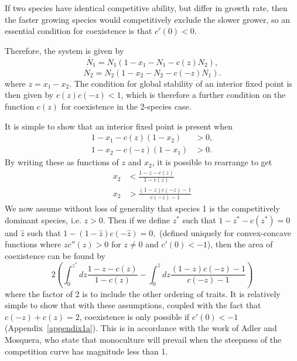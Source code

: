 If two species have identical competitive ability, but differ in growth rate, then the faster growing species would competitively exclude the slower grower, so an essential condition for coexistence is that $c'(0) <0$. 
 
Therefore, the system is given by
\begin{equation}
 \dot{N_1}=N_1\left(1-x_1 -N_1-c(z)N_2\right),
\end{equation}
\begin{equation}
  \dot{N_2}=N_2\left(1-x_2 -N_2-c(-z)N_1\right).
  \end{equation}
  where $z=x_1-x_2$. The condition for global stability of an interior fixed point is then given by $c(z)c(-z)<1$, which is therefore a further condition on the function $c(z)$ for coexistence in the 2-species case.

It is simple to show that an interior fixed point is present when 
\begin{align}
1-x_1-c(z)(1-x_2)&>0, \\
1-x_2-c(-z)(1-x_1)&>0. \end{align}
By writing these as functions of $z$ and $x_2$, it is possible to rearrange to get
\begin{align}
\label{x2upper}
x_2&<\frac{1-z-c(z)}{1-c(z)} \\
\label{x2lower}x_2&>\frac{(1-z)c(-z)-1}{c(-z)-1} \end{align}
We now assume without loss of generality that species 1 is the competitively dominant species, i.e. $z>0$. Then if we define $z^*$ such that
$
1-z^*-c(z^*)=0$
and $\hat{z}$ such that
$1-(1-\hat{z})c(-\hat{z})=0,$
 (defined uniquely for convex-concave functions where $z c''(z)>0$ for $z\neq0$ and $c'(0)<-1$),
then the area of coexistence can be found by
\begin{equation}
\label{areacoexist}
2\left( \int^{z^*}_0 dz \frac{1-z-c(z)}{1-c(z)} - \int^{\hat{z}}_0 dz \frac{(1-z)c(-z)-1}{c(-z)-1} \right)
\end{equation}
where the factor of 2 is to include the other ordering of traits. It is relatively simple to show that with these assumptions, coupled with the fact that $c(-z)+c(z)=2$, coexistence is only possible if $c'(0)<-1$ (Appendix~\ref{appendix1a}). This is in accordance with the work of Adler and Mosquera, who state that monoculture will prevail when the steepness of the competition curve has magnitude less than 1.

